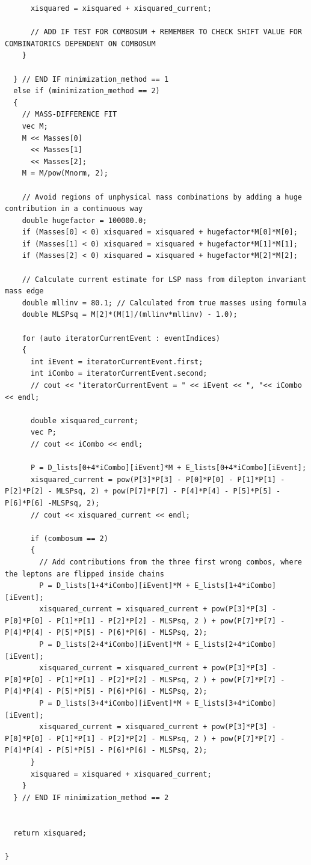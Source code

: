 \documentclass[twoside,english]{uiofysmaster}
\begin{document}
\begin{lstlisting}
      xisquared = xisquared + xisquared_current;

      // ADD IF TEST FOR COMBOSUM + REMEMBER TO CHECK SHIFT VALUE FOR COMBINATORICS DEPENDENT ON COMBOSUM
    }
      
  } // END IF minimization_method == 1
  else if (minimization_method == 2)
  {
    // MASS-DIFFERENCE FIT
    vec M;
    M << Masses[0]
      << Masses[1]
      << Masses[2];
    M = M/pow(Mnorm, 2);
  
    // Avoid regions of unphysical mass combinations by adding a huge contribution in a continuous way
    double hugefactor = 100000.0;
    if (Masses[0] < 0) xisquared = xisquared + hugefactor*M[0]*M[0];
    if (Masses[1] < 0) xisquared = xisquared + hugefactor*M[1]*M[1];
    if (Masses[2] < 0) xisquared = xisquared + hugefactor*M[2]*M[2];
  
    // Calculate current estimate for LSP mass from dilepton invariant mass edge
    double mllinv = 80.1; // Calculated from true masses using formula
    double MLSPsq = M[2]*(M[1]/(mllinv*mllinv) - 1.0);
  
    for (auto iteratorCurrentEvent : eventIndices)
    {
      int iEvent = iteratorCurrentEvent.first;
      int iCombo = iteratorCurrentEvent.second;
      // cout << "iteratorCurrentEvent = " << iEvent << ", "<< iCombo << endl;

      double xisquared_current;
      vec P;
      // cout << iCombo << endl;

      P = D_lists[0+4*iCombo][iEvent]*M + E_lists[0+4*iCombo][iEvent];
      xisquared_current = pow(P[3]*P[3] - P[0]*P[0] - P[1]*P[1] - P[2]*P[2] - MLSPsq, 2) + pow(P[7]*P[7] - P[4]*P[4] - P[5]*P[5] - P[6]*P[6] -MLSPsq, 2);
      // cout << xisquared_current << endl;

      if (combosum == 2)
      {
        // Add contributions from the three first wrong combos, where the leptons are flipped inside chains
        P = D_lists[1+4*iCombo][iEvent]*M + E_lists[1+4*iCombo][iEvent];
        xisquared_current = xisquared_current + pow(P[3]*P[3] - P[0]*P[0] - P[1]*P[1] - P[2]*P[2] - MLSPsq, 2 ) + pow(P[7]*P[7] - P[4]*P[4] - P[5]*P[5] - P[6]*P[6] - MLSPsq, 2);
        P = D_lists[2+4*iCombo][iEvent]*M + E_lists[2+4*iCombo][iEvent];
        xisquared_current = xisquared_current + pow(P[3]*P[3] - P[0]*P[0] - P[1]*P[1] - P[2]*P[2] - MLSPsq, 2 ) + pow(P[7]*P[7] - P[4]*P[4] - P[5]*P[5] - P[6]*P[6] - MLSPsq, 2);
        P = D_lists[3+4*iCombo][iEvent]*M + E_lists[3+4*iCombo][iEvent];
        xisquared_current = xisquared_current + pow(P[3]*P[3] - P[0]*P[0] - P[1]*P[1] - P[2]*P[2] - MLSPsq, 2 ) + pow(P[7]*P[7] - P[4]*P[4] - P[5]*P[5] - P[6]*P[6] - MLSPsq, 2);
      }
      xisquared = xisquared + xisquared_current;
    }
  } // END IF minimization_method == 2


  return xisquared;

}
\end{lstlisting}







% 
% 
\printbibliography
\end{document}
